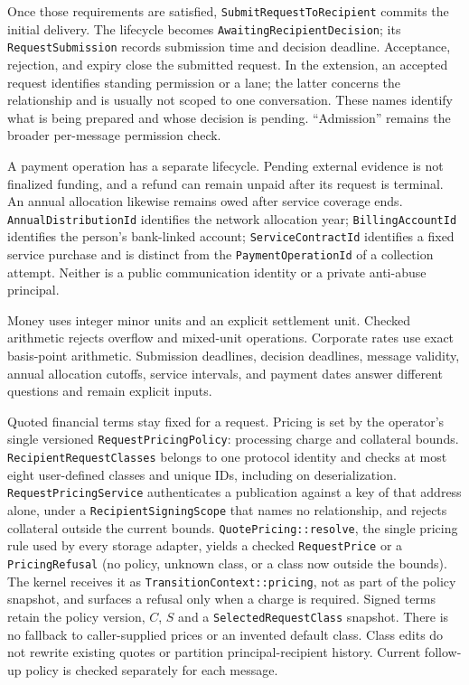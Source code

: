 \documentclass[11pt]{article}
\begin{document}
Once those requirements are satisfied, \texttt{SubmitRequestToRecipient} commits
the initial delivery. The lifecycle becomes \texttt{AwaitingRecipientDecision};
its \texttt{RequestSubmission} records submission time and decision deadline.
Acceptance, rejection, and expiry close the submitted request. In the extension,
an accepted request identifies standing permission or a lane; the latter concerns
the relationship and is usually not scoped to one conversation. These names
identify what is being prepared and whose decision is pending. ``Admission''
remains the broader per-message permission check.

A payment operation has a separate lifecycle. Pending external evidence is not
finalized funding, and a refund can remain unpaid after its request is terminal.
An annual allocation likewise remains owed after service coverage ends.
\texttt{AnnualDistributionId} identifies the network allocation year;
\texttt{BillingAccountId} identifies the person's bank-linked account;
\texttt{ServiceContractId} identifies a fixed service purchase and is distinct
from the \texttt{PaymentOperationId} of a collection attempt.
Neither is a public communication identity or a private anti-abuse principal.

Money uses integer minor units and an explicit settlement unit. Checked
arithmetic rejects overflow and mixed-unit operations. Corporate rates use exact
basis-point arithmetic. Submission deadlines, decision deadlines, message
validity, annual allocation cutoffs, service intervals, and payment dates answer
different questions and remain explicit inputs.

Quoted financial terms stay fixed for a request. Pricing is set by the operator's
single versioned \texttt{RequestPricingPolicy}: processing charge and collateral bounds.
\texttt{RecipientRequestClasses} belongs to one protocol identity and
checks at most eight user-defined classes and unique IDs, including on
deserialization. \texttt{RequestPricingService} authenticates a publication
against a key of that address alone, under a \texttt{RecipientSigningScope} that
names no relationship, and rejects collateral outside the current bounds.
\texttt{QuotePricing::resolve}, the single pricing rule used by every storage
adapter, yields a checked \texttt{RequestPrice} or a \texttt{PricingRefusal} (no
policy, unknown class, or a class now outside the bounds). The kernel receives it as
\texttt{TransitionContext::pricing}, not as part of the policy snapshot, and
surfaces a refusal only when a charge is required. Signed
terms retain the policy version, $C$, $S$ and a \texttt{SelectedRequestClass}
snapshot. There is no fallback to caller-supplied
prices or an invented default class. Class edits do not rewrite existing quotes
or partition principal-recipient history. Current follow-up policy is checked
separately for each message.
\end{document}

